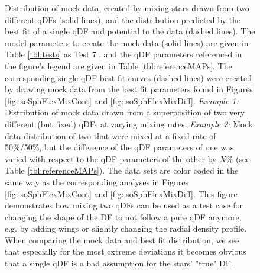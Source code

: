 \begin{figure}
\caption{Distribution of mock data, created by mixing stars drawn from two different qDFs (solid lines), and the distribution predicted by the best fit of a single qDF and potential to the data (dashed lines). The model parameters to create the mock data (solid lines) are given in Table \ref{tbl:tests} as Test \textcircled{7}, and the qDF parameters referenced in the figure's legend are given in Table \ref{tbl:referenceMAPs}. The corresponding single qDF best fit curves (dashed lines) were created by drawing mock data from the best fit parameters found in Figures \ref{fig:isoSphFlexMixCont} and \ref{fig:isoSphFlexMixDiff}. \emph{Example 1:} Distribution of mock data drawn from a superposition of two very different (but fixed) qDFs at varying mixing rates. \emph{Example 2:} Mock data distribution of two \MAPs that were mixed at a fixed rate of 50\%/50\%, but the difference of the qDF parameters of one \MAP was varied with respect to the qDF parameters of the other \MAP by $X\%$ (see Table \ref{tbl:referenceMAPs}). The data sets are color coded in the same way as the corresponding analyses in Figures  \ref{fig:isoSphFlexMixCont} and \ref{fig:isoSphFlexMixDiff}. This figure demonstrates how mixing two qDFs can be used as a test case for changing the shape of the DF to not follow a pure qDF anymore, e.g. by adding wings or slightly changing the radial density profile. When comparing the mock data and best fit distribution, we see that especially for the most extreme deviations it becomes obvious that a single qDF is a bad assumption for the stars' "true" DF.}
\label{fig:isoSphFlexMix_mockdata_residuals}
\end{figure}



